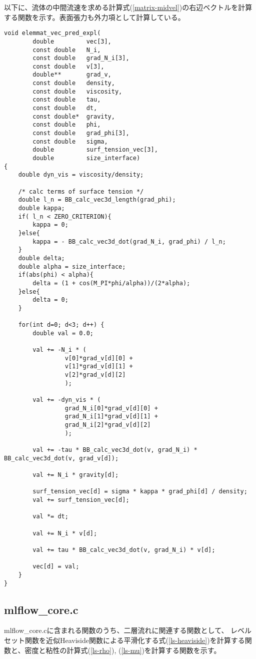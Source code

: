 以下に、流体の中間流速を求める計算式(\ref{matrix-midvel})の右辺ベクトルを計算する関数を示す。表面張力も外力項として計算している。
\begin{lstlisting}[caption = mlflow\_element.cの中間流速の右辺ベクトルの計算]
void elemmat_vec_pred_expl(
		double         vec[3],
		const double   N_i,
		const double   grad_N_i[3],
		const double   v[3],
		double**       grad_v,
		const double   density,
		const double   viscosity,
		const double   tau,
		const double   dt, 
		const double*  gravity,
		const double   phi,
		const double   grad_phi[3],
		const double   sigma,
		double         surf_tension_vec[3],
		double         size_interface)
{
	double dyn_vis = viscosity/density;

	/* calc terms of surface tension */
	double l_n = BB_calc_vec3d_length(grad_phi);
	double kappa;
	if( l_n < ZERO_CRITERION){
		kappa = 0;
	}else{
		kappa = - BB_calc_vec3d_dot(grad_N_i, grad_phi) / l_n;
	}
	double delta;
	double alpha = size_interface;
	if(abs(phi) < alpha){
		delta = (1 + cos(M_PI*phi/alpha))/(2*alpha);
	}else{
		delta = 0;
	}

	for(int d=0; d<3; d++) {
		double val = 0.0;
		
		val += -N_i * ( 
				 v[0]*grad_v[d][0] + 
				 v[1]*grad_v[d][1] + 
				 v[2]*grad_v[d][2] 
				 );

		val += -dyn_vis * ( 
				 grad_N_i[0]*grad_v[d][0] +
				 grad_N_i[1]*grad_v[d][1] +
				 grad_N_i[2]*grad_v[d][2] 
				 );

	   	val += -tau * BB_calc_vec3d_dot(v, grad_N_i) * BB_calc_vec3d_dot(v, grad_v[d]);

	   	val += N_i * gravity[d];

	   	surf_tension_vec[d] = sigma * kappa * grad_phi[d] / density;
	   	val += surf_tension_vec[d];

		val *= dt;

		val += N_i * v[d];

		val += tau * BB_calc_vec3d_dot(v, grad_N_i) * v[d];

		vec[d] = val;
	}
}
\end{lstlisting}

\subsection{mlflow\_core.c}
mlflow\_core.cに含まれる関数のうち、二層流れに関連する関数として、
レベルセット関数を近似Heaviside関数による平滑化する式(\ref{ls-heaviside})を計算する関数と、密度と粘性の計算式(\ref{ls-rho}), (\ref{ls-mu})を計算する関数を示す。

